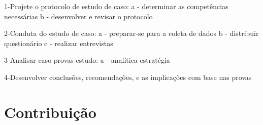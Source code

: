 1-Projete o protocolo de estudo de caso:
	a - determinar as competências necessárias
	b - desenvolver e revisar o protocolo

2-Conduta do estudo de caso:
	a - preparar-se para a coleta de dados
	b - distribuir questionário
	c - realizar entrevistas

3 Analisar caso provas estudo:
	a - analítica estratégia

4-Desenvolver conclusões, recomendações, e as implicações com base nas provas


\section{Contribuição}